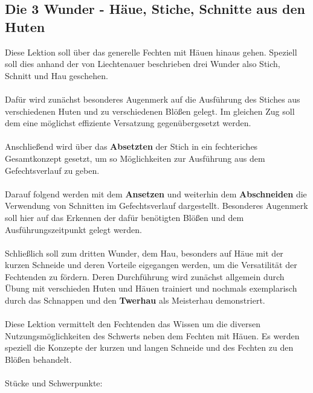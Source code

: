 \newpage

\begin{center}
\end{center}
\newpage

\subsection{Die 3 Wunder - Häue, Stiche, Schnitte aus den Huten}\label{Wunder}

\begin{center}
\end{center}
Diese Lektion soll über das generelle Fechten mit Häuen hinaus gehen. Speziell soll dies anhand der von Liechtenauer beschrieben drei Wunder also Stich, Schnitt und Hau geschehen.
\\
\\
Dafür wird zunächst besonderes Augenmerk auf die Ausführung des Stiches aus verschiedenen Huten und zu verschiedenen Blößen gelegt. Im gleichen Zug soll dem eine möglichst effiziente Versatzung gegenübergesetzt werden.
\\
\\
Anschließend wird über das \textbf{Absetzten} der Stich in ein fechteriches Gesamtkonzept gesetzt, um so Möglichkeiten zur Ausführung aus dem Gefechtsverlauf zu geben.
\\
\\
Darauf folgend werden mit dem \textbf{Ansetzen} und weiterhin dem \textbf{Abschneiden} die Verwendung von Schnitten im Gefechtsverlauf dargestellt. Besonderes Augenmerk soll hier auf das Erkennen der dafür benötigten Blößen und dem Ausführungszeitpunkt gelegt werden.
\\
\\
Schließlich soll zum dritten Wunder, dem Hau, besonders auf Häue mit der kurzen Schneide und deren Vorteile eigegangen werden, um die Versatilität der Fechtenden zu fördern. Deren Durchführung wird zunächst allgemein durch Übung mit verschieden Huten und Häuen trainiert und nochmals exemplarisch durch das Schnappen und den \textbf{Twerhau} als Meisterhau demonstriert.
\\
\\
Diese Lektion vermittelt den Fechtenden das Wissen um die diversen Nutzungsmöglichkeiten des Schwerts neben dem Fechten mit Häuen. Es werden speziell die Konzepte der kurzen und langen Schneide und des Fechten zu den Blößen behandelt.
\\
\\
Stücke und Schwerpunkte:
 
